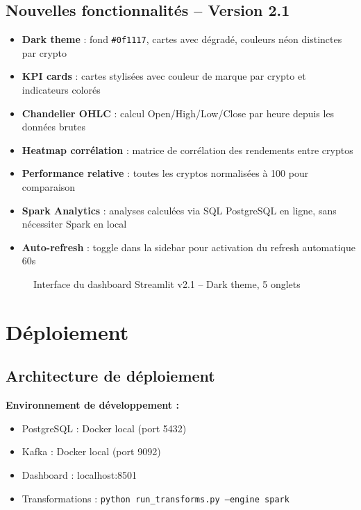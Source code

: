 \documentclass[12pt,a4paper]{article}
\begin{document}
\subsection{Nouvelles fonctionnalités -- Version 2.1}

\begin{itemize}
    \item \textbf{Dark theme} : fond \texttt{\#0f1117}, cartes avec dégradé, couleurs néon distinctes par crypto
    \item \textbf{KPI cards} : cartes stylisées avec couleur de marque par crypto et indicateurs colorés
    \item \textbf{Chandelier OHLC} : calcul Open/High/Low/Close par heure depuis les données brutes
    \item \textbf{Heatmap corrélation} : matrice de corrélation des rendements entre cryptos
    \item \textbf{Performance relative} : toutes les cryptos normalisées à 100 pour comparaison
    \item \textbf{Spark Analytics} : analyses calculées via SQL PostgreSQL en ligne, sans nécessiter Spark en local
    \item \textbf{Auto-refresh} : toggle dans la sidebar pour activation du refresh automatique 60s
\end{itemize}

\begin{figure}[H]
    \centering
    \caption{Interface du dashboard Streamlit v2.1 -- Dark theme, 5 onglets}
\end{figure}

\section{Déploiement}

\subsection{Architecture de déploiement}

\textbf{Environnement de développement :}
\begin{itemize}[noitemsep]
    \item PostgreSQL : Docker local (port 5432)
    \item Kafka : Docker local (port 9092)
    \item Dashboard : localhost:8501
    \item Transformations : \texttt{python run\_transforms.py --engine spark}
\end{itemize}
\end{document}
